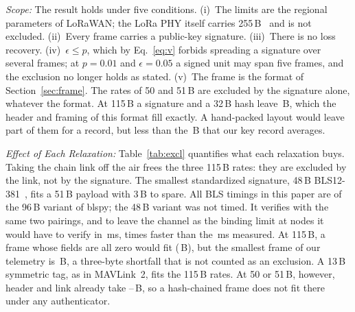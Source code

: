 \documentclass[lineno,pdflatex,sn-mathphys-num]{sn-jnl}
\newcommand{\runin}[1]{\textit{#1:}}
\renewcommand{\_}{\authbcunderscore\allowbreak}
\begin{document}
\runin{Scope} The result holds under five conditions. (i)~The limits are the regional parameters
of LoRaWAN; the LoRa PHY itself carries 255\,B~\cite{semtech_sx1276} and is not excluded.
(ii)~Every frame carries a public-key signature. (iii)~There is no loss recovery.
(iv)~$\epsilon \leq p$, which by Eq.~\eqref{eq:v} forbids spreading a signature over several
frames; at $p=0.01$ and $\epsilon=0.05$ a signed unit may span five frames, and the exclusion no
longer holds as stated. (v)~The frame is the format of Section~\ref{sec:frame}. The
\exclSigCount{} rates of 50 and 51\,B are excluded by the signature alone, whatever the format.
At 115\,B a signature and a 32\,B hash leave \exRoomAfterCrypto\,B, which the header and framing
of this format fill exactly. A hand-packed layout would leave part of them for a record, but less
than the \keyLean\,B that our key record averages.

\runin{Effect of Each Relaxation} Table~\ref{tab:excl} quantifies what each relaxation buys.
Taking the chain link off the air frees the three 115\,B rates: they are excluded by the link, not
by the signature. The smallest standardized signature, 48\,B BLS12-381~\cite{cfrg_bls}, fits a
51\,B payload with 3\,B to spare.
All BLS timings in this paper are of the 96\,B variant of blspy; the 48\,B variant was
not timed. It verifies with the same two pairings, and to leave the channel as the binding limit
at \nmaxLeanDesign{} nodes it would have to verify in \blsVerNeedMs\,ms, \blsSpeedup{} times
faster than the \tVerBls\,ms measured.
At 115\,B, a frame whose fields are all zero would fit (\exFloorBls\,B), but the smallest frame of
our telemetry is \exLoBls\,B, a three-byte shortfall that is not counted as an exclusion. A 13\,B
symmetric tag, as in MAVLink~2, fits the 115\,B rates. At 50 or 51\,B, however, header and link
already take \exHdrLinkLo--\exHdrLinkHi\,B, so a hash-chained frame does not fit there under any
authenticator.
\end{document}
